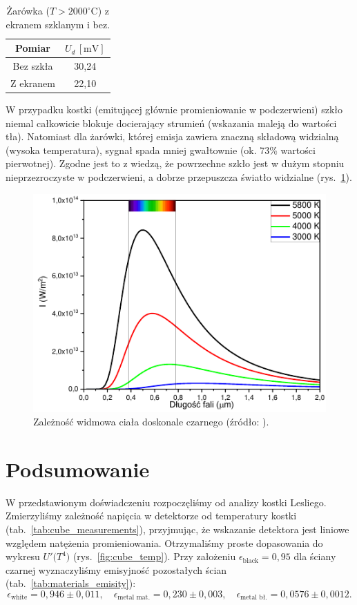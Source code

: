 \documentclass[12pt]{article}
\begin{document}
\begin{table}[H]
	\centering
	\begin{tabular}{cc}
		\toprule
		Pomiar      & $U_d\,[\mathrm{mV}]$ \\
		\midrule
		Bez szkła   & 30{,}24 \\
		Z ekranem   & 22{,}10 \\
		\bottomrule
	\end{tabular}
	\caption{Żarówka ($T\!>\!2000^\circ\mathrm{C}$) z ekranem szklanym i bez.}
	\label{tab:bulb_glass}
\end{table}

W przypadku kostki (emitującej głównie promieniowanie w podczerwieni) szkło niemal całkowicie blokuje docierający strumień (wskazania maleją do wartości tła). Natomiast dla żarówki, której emisja zawiera znaczną składową widzialną (wysoka temperatura), sygnał spada mniej gwałtownie (ok. 73\% wartości pierwotnej). Zgodne jest to z wiedzą, że powrzechne szkło jest w dużym stopniu nieprzezroczyste w podczerwieni, a dobrze przepuszcza światło widzialne (rys.~\ref{fig:black_body}).

\begin{figure}[H]
	\centering
	\includegraphics[scale=0.65]{black_body}
	\caption{Zależność widmowa ciała doskonale czarnego (źródło: \cite{skrypt}).}
	\label{fig:black_body}
\end{figure}

\section{Podsumowanie}
W przedstawionym doświadczeniu rozpoczęliśmy od analizy kostki Lesliego. Zmierzyliśmy zależność napięcia w detektorze od temperatury kostki (tab.~\ref{tab:cube_measurements}), przyjmując, że wskazanie detektora jest liniowe względem natężenia promieniowania. Otrzymaliśmy proste dopasowania do wykresu $U'\bigl(T^4\bigr)$ (rys.~\ref{fig:cube_temp}). Przy założeniu $\epsilon_{\text{black}}=0{,}95$ dla ściany czarnej wyznaczyliśmy emisyjność pozostałych ścian (tab.~\ref{tab:materials_emisity}): 
\[
\epsilon_{\text{white}} = 0{,}946 \pm 0{,}011,\quad
\epsilon_{\text{metal~mat.}} = 0{,}230 \pm 0{,}003,\quad
\epsilon_{\text{metal~bł.}} = 0{,}0576 \pm 0{,}0012.
\]
\end{document}
